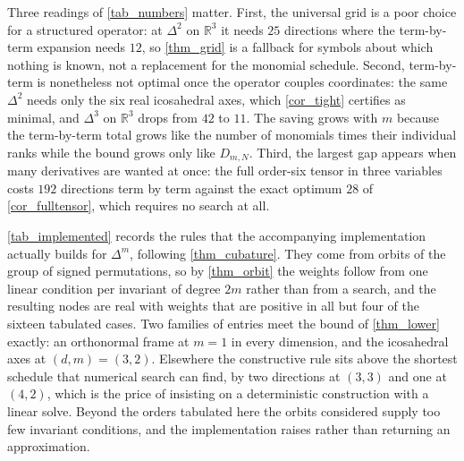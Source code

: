 \documentclass[final]{siamltex}
\newcommand{\R}{\mathbb{R}}
\begin{document}
Three readings of \cref{tab_numbers} matter.  First, the universal grid is a
poor choice for a structured operator: at $\Delta^{2}$ on $\R^{3}$ it needs $25$
directions where the term-by-term expansion needs $12$, so \cref{thm_grid} is a
fallback for symbols about which nothing is known, not a replacement for the
monomial schedule.  Second, term-by-term is nonetheless not optimal once the
operator couples coordinates: the same $\Delta^{2}$ needs only the six real
icosahedral axes, which \cref{cor_tight} certifies as minimal, and $\Delta^{3}$
on $\R^{3}$ drops from $42$ to $11$.  The saving grows with $m$ because the
term-by-term total grows like the number of monomials times their individual
ranks while the bound grows only like $D_{m,N}$.  Third, the largest gap appears
when many derivatives are wanted at once: the full order-six tensor in three
variables costs $192$ directions term by term against the exact optimum $28$ of
\cref{cor_fulltensor}, which requires no search at all.

\cref{tab_implemented} records the rules that the accompanying implementation
actually builds for $\Delta^{m}$, following \cref{thm_cubature}.  They come from
orbits of the group of signed permutations, so by \cref{thm_orbit} the weights
follow from one linear condition per invariant of degree $2m$ rather than from a
search, and the resulting nodes are real with weights that are positive in all
but four of the sixteen tabulated cases.  Two families of entries meet the bound of
\cref{thm_lower} exactly: an orthonormal frame at $m=1$ in every dimension, and
the icosahedral axes at $(d,m) = (3,2)$.  Elsewhere the constructive rule sits
above the shortest schedule that numerical search can find, by two directions at
$(3,3)$ and one at $(4,2)$, which is the price of insisting on a deterministic
construction with a linear solve.  Beyond the orders tabulated here the orbits
considered supply too few invariant conditions, and the implementation raises
rather than returning an approximation.
\end{document}
